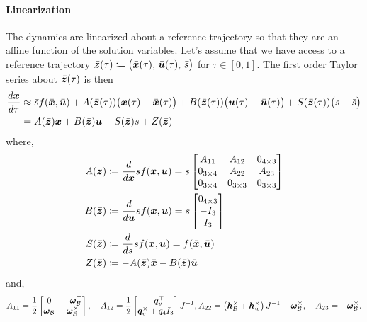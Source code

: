 \documentclass[10pt]{article}
\begin{document}
\paragraph{Linearization}
The dynamics are linearized about a reference trajectory so that they are an affine function of the solution variables. Let's assume that we have access to a reference trajectory $\bar{\bm{z}}(\tau) \coloneqq \big(\bar{\bm{x}}(\tau),\,\bar{\bm{u}}(\tau),\,\bar{s}\big)$ for $\tau\in[0,1]$. The first order Taylor series about $\bar{\bm{z}}(\tau)$ is then
\begin{subequations}\label{eq:linearization}
\begin{align}
\frac{d \bm{x}}{d \tau} &\approx \bar{s} f(\bar{\bm{x}},\bar{\bm{u}}) + A(\bar{\bm{z}}(\tau)) \big(\bm{x}(\tau)-\bar{\bm{x}}(\tau) \big) + B(\bar{\bm{z}}(\tau)) \big( \bm{u}(\tau) - \bar{\bm{u}}(\tau) \big) + S(\bar{\bm{z}}(\tau)) \big( s - \bar{s} \big) \\
&= A(\bar{\bm{z}}) \bm{x} + B(\bar{\bm{z}}) \bm{u} + S(\bar{\bm{z}}) s + Z(\bar{\bm{z}})
\end{align}
\end{subequations}
where,
\begin{subequations}
\begin{align}
A(\bar{\bm{z}}) &\coloneqq \frac{d }{d \bm{x}} s f(\bm{x},\bm{u}) = s \begin{bmatrix}
A_{11} & A_{12} & 0_{4 \times 3} \\
0_{3 \times 4} & A_{22} & A_{23} \\
0_{3 \times 4} & 0_{3 \times 3} & 0_{3 \times 3}
\end{bmatrix} \\
B(\bar{\bm{z}}) &\coloneqq \frac{d }{d \bm{u}} s f(\bm{x},\bm{u}) = s \begin{bmatrix}
0_{4 \times 3} \\ -I_{3} \\ I_{3}
\end{bmatrix} \\
S(\bar{\bm{z}}) &\coloneqq \frac{d }{d s} s f(\bm{x},\bm{u}) = f(\bar{\bm{x}},\bar{\bm{u}}) \\
Z(\bar{\bm{z}}) &\coloneqq - A(\bar{\bm{z}}) \bar{\bm{x}} - B(\bar{\bm{z}}) \bar{\bm{u}} 
\end{align}
\end{subequations}
and,
\begin{equation*}
A_{11} = \frac{1}{2} \begin{bmatrix}
0  & -\bm{\omega}_{\mathcal{B}}^{\top}  \\ \bm{\omega}_{\mathcal{B}} & \bm{\omega}_{\mathcal{B}}^{\times}
\end{bmatrix}, \quad A_{12} = \frac{1}{2}\begin{bmatrix}
-\bm{q}_v^{\top} \\ \bm{q}_v^{\times} + q_4 I_{3}
\end{bmatrix} J^{-1}, A_{22} = \left(\bm{h}_{\mathcal{B}}^{\times}+\bm{h}_w^{\times}\right)J^{-1} - \bm{\omega}_{\mathcal{B}}^{\times}, \quad A_{23} = - \bm{\omega}_{\mathcal{B}}^{\times}.
\end{equation*}
\end{document}
